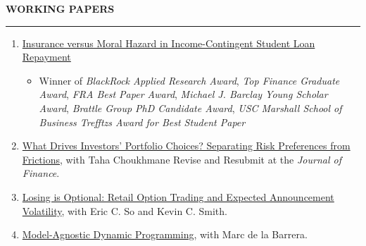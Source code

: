 \documentclass[a4paper, 10pt]{article}
\newcounter{mycounter}
\newcommand{\cvsec}[1]
{
	\needspace{2\baselineskip}
	\noindent \textbf{#1}
	
	\vspace{2pt}
	
	\hrule
	
	\bigskip
}
\newenvironment{cvcontinue}[1]
{
	\cvsec{#1}
	\begin{enumerate}
		\setcounter{enumi}{\themycounter}
	}
	{
	\setcounter{mycounter}{\theenumi}
	\end{enumerate}
}
\begin{document}
\begin{cvcontinue}{WORKING PAPERS}
	\item \href{https://www.timdesilva.me/files/papers/jmp_deSilva.pdf}{Insurance versus Moral Hazard in Income-Contingent Student Loan Repayment}
	\begin{itemize}
		\item Winner of \emph{BlackRock Applied Research Award}, \emph{Top Finance Graduate Award}, \emph{FRA Best Paper Award}, \emph{Michael J. Barclay Young Scholar Award}, \emph{Brattle Group PhD Candidate Award}, \emph{USC Marshall School of Business Trefftzs Award for Best Student Paper}
	\end{itemize}
	\item \href{https://www.timdesilva.me/files/papers/preferences_frictions.pdf}{What Drives Investors' Portfolio Choices? Separating Risk Preferences from Frictions}, with Taha Choukhmane \newline Revise and Resubmit at the \textit{Journal of Finance}.%
	\item \href{https://www.timdesilva.me/files/papers/losing_optional.pdf}{Losing is Optional: Retail Option Trading and Expected Announcement Volatility}, with Eric C. So and Kevin C. Smith.%
	\item \href{https://www.timdesilva.me/files/papers/agnostic_dp.pdf}{Model-Agnostic Dynamic Programming}, with Marc de la Barrera.%
\end{cvcontinue}
\end{document}
